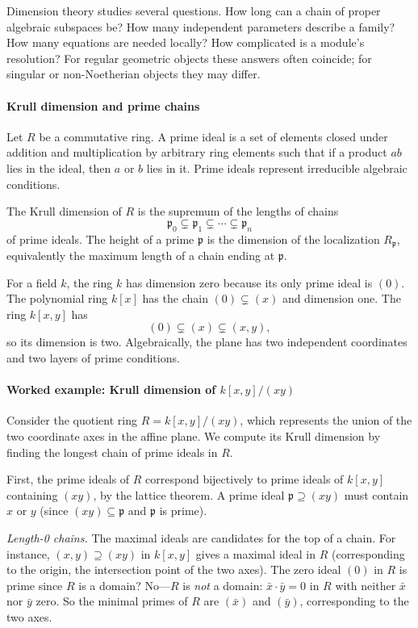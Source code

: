 Dimension theory studies several questions. How long can a chain of proper algebraic subspaces be? How many independent parameters describe a family? How many equations are needed locally? How complicated is a module's resolution? For regular geometric objects these answers often coincide; for singular or non-Noetherian objects they may differ. \cite{dimension_theory_ref1,dimension_theory_ref2}

\paragraph{Krull dimension and prime chains}

Let $R$ be a commutative ring. A prime ideal is a set of elements closed under addition and multiplication by arbitrary ring elements such that if a product $ab$ lies in the ideal, then $a$ or $b$ lies in it. Prime ideals represent irreducible algebraic conditions.

The Krull dimension of $R$ is the supremum of the lengths of chains
\[
 \mathfrak p_0\subsetneq\mathfrak p_1\subsetneq\cdots\subsetneq\mathfrak p_n
\]
of prime ideals. The height of a prime $\mathfrak p$ is the dimension of the localization $R_{\mathfrak p}$, equivalently the maximum length of a chain ending at $\mathfrak p$.

For a field $k$, the ring $k$ has dimension zero because its only prime ideal is $(0)$. The polynomial ring $k[x]$ has the chain $(0)\subsetneq(x)$ and dimension one. The ring $k[x,y]$ has
\[
 (0)\subsetneq(x)\subsetneq(x,y),
\]
so its dimension is two. Algebraically, the plane has two independent coordinates and two layers of prime conditions.

\paragraph{Worked example: Krull dimension of $k[x,y]/(xy)$}
Consider the quotient ring $R=k[x,y]/(xy)$, which represents the union of the two coordinate axes in the affine plane. We compute its Krull dimension by finding the longest chain of prime ideals in $R$.

First, the prime ideals of $R$ correspond bijectively to prime ideals of $k[x,y]$ containing $(xy)$, by the lattice theorem. A prime ideal $\mathfrak p\supseteq(xy)$ must contain $x$ or $y$ (since $(xy)\subseteq\mathfrak p$ and $\mathfrak p$ is prime).

\noindent\emph{Length-0 chains.} The maximal ideals are candidates for the top of a chain. For instance, $(x,y)\supseteq(xy)$ in $k[x,y]$ gives a maximal ideal in $R$ (corresponding to the origin, the intersection point of the two axes). The zero ideal $(0)$ in $R$ is prime since $R$ is a domain? No---$R$ is \emph{not} a domain: $\bar x\cdot\bar y=0$ in $R$ with neither $\bar x$ nor $\bar y$ zero. So the minimal primes of $R$ are $(\bar x)$ and $(\bar y)$, corresponding to the two axes.


